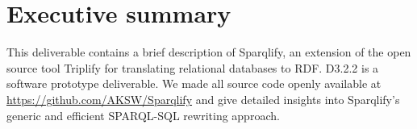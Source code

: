
\section*{Executive summary}

This deliverable contains a brief description of Sparqlify, an extension of the open source tool Triplify for translating relational databases to RDF.
D3.2.2 is a software prototype deliverable. 
We made all source code openly available at \url{https://github.com/AKSW/Sparqlify} and give detailed insights into
Sparqlify's generic and efficient SPARQL-SQL rewriting approach.


